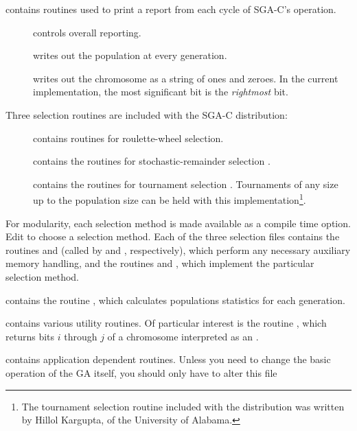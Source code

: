 \begin{description}
\item[{}] contains routines used to print a report from each cycle of SGA-C's operation.
\begin{description}
\item[{}] controls overall reporting.
\item[{}] writes out the population at every generation.
\item[{}] writes out the chromosome as a string of ones and zeroes.
In the current implementation, the most significant bit is the {\it rightmost} bit.
\end{description}
\item Three selection routines are included with the SGA-C distribution:
\begin{description}
\item[{}] contains routines for roulette-wheel selection.  
\item[{}] contains the routines for stochastic-remainder selection 
\cite{Booker:82}.
\item[{}] contains the routines for tournament selection 
\cite{Brindle:81a}.  Tournaments of any size up to the population size can be held
with this implementation\footnote{The tournament selection routine
included with the distribution was written by Hillol Kargupta, of the University
of Alabama.}.
\end{description}
For modularity, each selection method 
is made available as a compile time option.
Edit {} to choose a selection method. Each of the three
selection files 
contains the routines
{} and {} (called by {} and {}, respectively), which perform
any necessary auxiliary memory handling,
and the routines {} and {}, 
which implement the particular selection method.
\item[{\btt{stats.c}}] contains the routine {}, which calculates 
populations statistics for each generation.
\item[{\btt{utility.c}}] contains various utility routines. Of particular interest 
is the routine {}, which returns bits $i$ through $j$ of a 
chromosome interpreted as an {}. 
\item[{\btt{app.c}}] contains application dependent routines. 
Unless you need to change the basic operation of the GA itself, 
you should only have to alter this file

\end{description}
